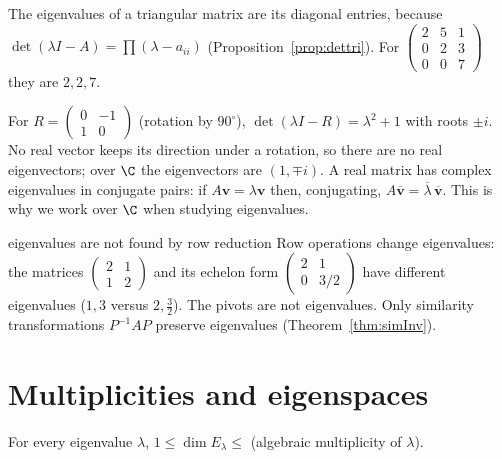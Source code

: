 \begin{example}
The eigenvalues of a triangular matrix are its diagonal entries, because $\det(\lambda I-A)=\prod(\lambda-a_{ii})$ (Proposition~\ref{prop:dettri}). For $\begin{pmatrix}2&5&1\\0&2&3\\0&0&7\end{pmatrix}$ they are $2,2,7$.
\end{example}

\begin{example}\label{ex:rotcomplex}
For $R=\begin{pmatrix}0&-1\\1&0\end{pmatrix}$ (rotation by $90^\circ$), $\det(\lambda I-R)=\lambda^2+1$ with roots $\pm i$. No real vector keeps its direction under a rotation, so there are no real eigenvectors; over $\C$ the eigenvectors are $(1,\mp i)$. A real matrix has complex eigenvalues in conjugate pairs: if $A\mathbf{v}=\lambda\mathbf{v}$ then, conjugating, $A\overline{\mathbf{v}}=\overline{\lambda}\,\overline{\mathbf{v}}$. This is why we work over $\C$ when studying eigenvalues.
\end{example}

\begin{pitfall}{eigenvalues are not found by row reduction}
Row operations change eigenvalues: the matrices $\begin{pmatrix}2&1\\1&2\end{pmatrix}$ and its echelon form $\begin{pmatrix}2&1\\0&3/2\end{pmatrix}$ have different eigenvalues ($1,3$ versus $2,\tfrac32$). The pivots are not eigenvalues. Only similarity transformations $P^{-1}AP$ preserve eigenvalues (Theorem~\ref{thm:simInv}).
\end{pitfall}

\section{Multiplicities and eigenspaces}

\begin{theorem}\label{thm:geoalg}
For every eigenvalue $\lambda$, $1\le\dim E_\lambda\le$ (algebraic multiplicity of $\lambda$).
\end{theorem}

